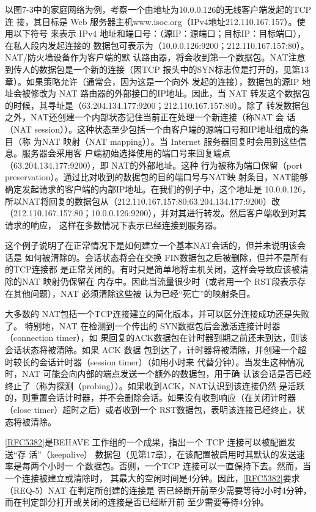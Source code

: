 以图7-3中的家庭网络为例，考察一个由地址为10.0.0.126的无线客户端发起的TCP 连
接，其目标是 Web 服务器主机www.isoc.org（IPv4地址212.110.167.157）。使用以下符号
来表示 IPv4 地址和端口号：（源IP：源端口；目标IP：目标端口），在私人段内发起连接的
数据包可表示为（10.0.0.126:9200；212.110.167.157:80）。NAT/防火墙设备作为客户端的默
认路由器，将会收到第一个数据包。NAT注意到传人的数据包是一个新的连接（因TCP
报头中的SYN标志位是打开的，见第13章）。如果策略允许（通常会，因为这是一个向外
发起的连接），数据包的源IP 地址会被修改为 NAT 路由器的外部接口的IP地址。因此，当
NAT 转发这个数据包的时候，其寻址是（63.204.134.177:9200；212.110.167.157:80）。除了
转发数据包之外，NAT还创建一个内部状态记住当前正在处理一个新连接（称NAT 会
话（NAT session））。这种状态至少包括一个由客户端的源端口号和IP地址组成的条目（称
为NAT 映射（NAT mapping））。当 Internet 服务器回复时会用到这些信息。服务器会采用客
户端初始选择使用的端口号来回复端点（63.204.134.177:9200），即 NAT的外部地址。这种
行为被称为端口保留（port preservation）。通过比对收到的数据包的目的端口号与NAT映
射条目，NAT能够确定发起请求的客户端的内部IP地址。在我们的例子中，这个地址是
10.0.0.126，所以NAT将回复的数据包从（212.110.167.157:80;63.204.134.177:9200）改
（212.110.167.157:80；10.0.0.126:9200），并对其进行转发。然后客户端收到对其请求的响应，
这样在多数情况下表示已经连接到服务器。

这个例子说明了在正常情况下是如何建立一个基本NAT会话的，但并未说明该会话是
如何被清除的。会话状态将会在交换 FIN数据包之后被删除，但并不是所有的TCP连接都
是正常关闭的。有时只是简单地将主机关闭，这样会导致应该被清除的NAT 映射仍保留在
内存中。因此当流量很少时（或者用一个 RST段表示存在其他问题），NAT 必须清除这些被
认为已经“死亡”的映射条目。

大多数的 NAT包括一个TCP连接建立的简化版本，并可以区分连接成功还是失败了。
特别地，NAT 在检测到一个传出的 SYN数据包后会激活连接计时器（connection timer），如
果回复的ACK数据包在计时器到期之前还未到达，则该会话状态将被清除。如果 ACK 数据
包到达了，计时器将被清除，并创建一个超时较长的会话计时器（session timer）（如用小时来
代替分钟）。当发生这种情况时，NAT 可能会向内部的端点发送一个额外的数据包，用于确
认该会话是否已经终止了（称为探测（probing））。如果收到ACK，NAT认识到该连接仍然
是活跃的，则重置会话计时器，并不会删除会话。如果没有收到响应（在关闭计时器（close
timer）超时之后）或者收到一个 RST数据包，表明该连接已经终止，状态将被清除。

\href{https://www.rfc-editor.org/rfc/rfc5382}{[RFC5382]}是BEHAVE
工作组的一个成果，指出一个 TCP 连接可以被配置发送“存
活”（keepalive） 数据包（见第17章），在该配置被启用时其默认的发送速率是每两个小时一
个数据包。否则，一个TCP 连接可以一直保持下去。然而，当一个连接被建立或清除时，
其最大的空闲时间是4分钟。因此，\href{https://www.rfc-editor.org/rfc/rfc5382}{[RFC5382]}要求（REQ-5）NAT
在判定所创建的连接是
否已经断开前至少需要等待2小时4分钟，而在判定部分打开或关闭的连接是否已经断开前
至少需要等待4分钟。

